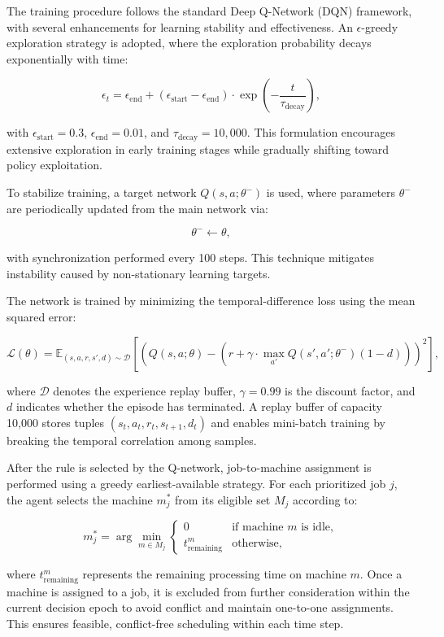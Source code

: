 \documentclass{article}
\begin{document}
The training procedure follows the standard Deep Q-Network (DQN) framework, with several enhancements for learning stability and effectiveness. An $\epsilon$-greedy exploration strategy is adopted, where the exploration probability decays exponentially with time:

\[
\epsilon_t = \epsilon_{\text{end}} + (\epsilon_{\text{start}} - \epsilon_{\text{end}}) \cdot \exp\left(-\frac{t}{\tau_{\text{decay}}}\right),
\]

with $\epsilon_{\text{start}} = 0.3$, $\epsilon_{\text{end}} = 0.01$, and $\tau_{\text{decay}} = 10{,}000$. This formulation encourages extensive exploration in early training stages while gradually shifting toward policy exploitation.

To stabilize training, a target network $Q(s, a; \theta^-)$ is used, where parameters $\theta^-$ are periodically updated from the main network via:

\[
\theta^- \leftarrow \theta,
\]

with synchronization performed every 100 steps. This technique mitigates instability caused by non-stationary learning targets.

The network is trained by minimizing the temporal-difference loss using the mean squared error:

\[
\mathcal{L}(\theta) = \mathbb{E}_{(s,a,r,s',d) \sim \mathcal{D}} \left[\left(Q(s,a;\theta) - \left(r + \gamma \cdot \max_{a'} Q(s',a';\theta^-)(1 - d)\right)\right)^2\right],
\]

where $\mathcal{D}$ denotes the experience replay buffer, $\gamma = 0.99$ is the discount factor, and $d$ indicates whether the episode has terminated. A replay buffer of capacity 10{,}000 stores tuples $(s_t, a_t, r_t, s_{t+1}, d_t)$ and enables mini-batch training by breaking the temporal correlation among samples.

After the rule is selected by the Q-network, job-to-machine assignment is performed using a greedy earliest-available strategy. For each prioritized job $j$, the agent selects the machine $m_j^*$ from its eligible set $M_j$ according to:

\[
m_j^* = \arg\min_{m \in M_j}
\begin{cases}
0 & \text{if machine } m \text{ is idle}, \\
t_{\text{remaining}}^m & \text{otherwise},
\end{cases}
\]

where $t_{\text{remaining}}^m$ represents the remaining processing time on machine $m$. Once a machine is assigned to a job, it is excluded from further consideration within the current decision epoch to avoid conflict and maintain one-to-one assignments. This ensures feasible, conflict-free scheduling within each time step.
\end{document}
